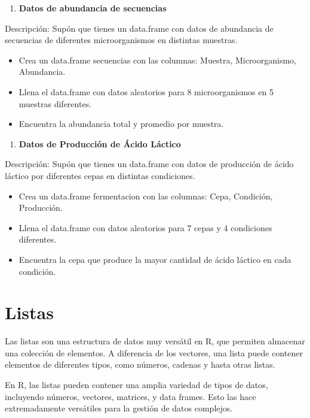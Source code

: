 \documentclass[
]{book}
\providecommand{\tightlist}{%
  \setlength{\itemsep}{0pt}\setlength{\parskip}{0pt}}
\begin{document}
\begin{enumerate}
\def\labelenumi{\arabic{enumi}.}
\setcounter{enumi}{2}
\tightlist
\item
  \textbf{Datos de abundancia de secuencias}
\end{enumerate}

Descripción: Supón que tienes un data.frame con datos de abundancia de secuencias de diferentes microorganismos en distintas muestras.

\begin{itemize}
\tightlist
\item
  Crea un data.frame secuencias con las columnas: Muestra, Microorganismo, Abundancia.
\item
  Llena el data.frame con datos aleatorios para 8 microorganismos en 5 muestras diferentes.
\item
  Encuentra la abundancia total y promedio por muestra.
\end{itemize}

\begin{enumerate}
\def\labelenumi{\arabic{enumi}.}
\setcounter{enumi}{3}
\tightlist
\item
  \textbf{Datos de Producción de Ácido Láctico}
\end{enumerate}

Descripción: Supón que tienes un data.frame con datos de producción de ácido láctico por diferentes cepas en distintas condiciones.

\begin{itemize}
\tightlist
\item
  Crea un data.frame fermentacion con las columnas: Cepa, Condición, Producción.
\item
  Llena el data.frame con datos aleatorios para 7 cepas y 4 condiciones diferentes.
\item
  Encuentra la cepa que produce la mayor cantidad de ácido láctico en cada condición.
\end{itemize}

\chapter{Listas}\label{Listas}

Las listas son una estructura de datos muy versátil en R, que permiten almacenar una colección de elementos. A diferencia de los vectores, una lista puede contener elementos de diferentes tipos, como números, cadenas y hasta otras listas.

En R, las listas pueden contener una amplia variedad de tipos de datos, incluyendo números, vectores, matrices, y data frames. Esto las hace extremadamente versátiles para la gestión de datos complejos.
\end{document}
